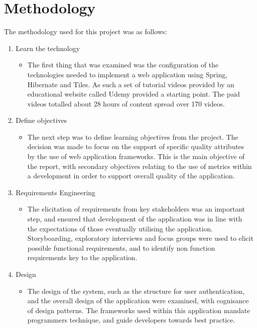 \section{Methodology}

The methodology used for this project was as follows:

\begin{enumerate}
\item Learn the technology
\begin{itemize}
\item The first thing that was examined was the configuration of the technologies needed to implement a web application using Spring, Hibernate and Tiles. As such a set of tutorial videos provided by an educational website called Udemy provided a starting point. The paid videos totalled about 28 hours of content spread over 170 videos.\parencite{udemy}
\end{itemize}
\item Define objectives
\begin{itemize}
\item The next step was to define learning objectives from the project. The decision was made to focus on the support of specific quality attributes by the use of web application frameworks. This is the main objective of the report, with secondary objectives relating to the use of metrics within a development in order to support overall quality of the application.
\end{itemize}
\item Requirements Engineering
\begin{itemize}
\item The elicitation of requirements from key stakeholders was an important step, and ensured that development of the application was in line with the expectations of those eventually utilising the application. Storyboarding, exploratory interviews and focus groups were used to elicit possible functional requirements, and to identify non function requirements key to the application.
\end{itemize}
\item Design
\begin{itemize}
\item The design of the system, such as the structure for user authentication, and the overall design of the application were examined, with cognisance of design patterns. The frameworks used within this application mandate programmers technique, and guide developers towards best practice.
\end{itemize}

\end{enumerate}
